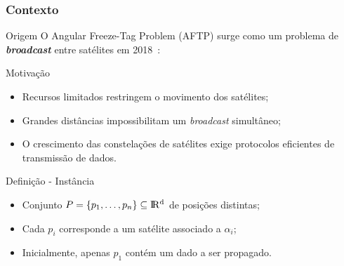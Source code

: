 
\subsubsection{Contexto}

\stopcounter
\begin{frame}{Origem}
  O Angular Freeze-Tag Problem (AFTP) surge como um problema de \textbf{\emph{broadcast}} entre satélites em 2018~\cite{Fe18}:
  \bigbreak
  \begin{minipage}{\linewidth}
    \centering
    \colorbox{white}{}
  \end{minipage}
\end{frame}
\inccounter

\begin{frame}{Motivação}
  \begin{itemize}[<+->]

    \item Recursos limitados restringem o movimento dos satélites;

    \item Grandes distâncias impossibilitam um \emph{broadcast} simultâneo;

    \item O crescimento das constelações de satélites exige protocolos eficientes de transmissão de dados.

  \end{itemize}
\end{frame}

\begin{frame}{Definição - Instância}
  \begin{itemize}[<+->]

    \item Conjunto $P = \{p_1, \dots, p_n\}\subseteq \rm I\!R^d$ de posições distintas;

    \item Cada $p_i$ corresponde a um satélite associado a $\alpha_i$;

    \item Inicialmente, apenas $p_1$ contém um dado a ser propagado.

  \end{itemize}
\end{frame}

